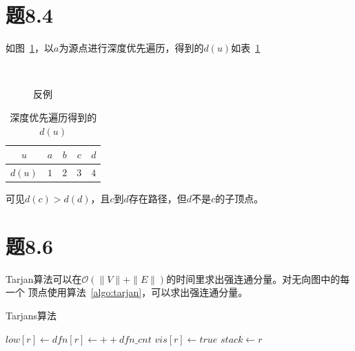 \documentclass[a4paper,twoside]{article}
\begin{document}
\begin{spacing}{1.2}
\section{题8.4}

如图~\ref{fig:t84_example}，以$a$为源点进行深度优先遍历，得到的$d(u)$如表~\ref{tbl:du}

\begin{figure}[htbp]
	\centering
	\label{fig:t84_example}
	~
	\caption{反例}
\end{figure}

\begin{table}[H]
	\centering
	\label{tbl:du}
	\begin{tabular}{ccccc}
		\toprule
		$u$ & $a$ & $b$ & $c$ & $d$ \\
		\midrule
		$d(u)$ & $1$ & $2$ & $3$ & $4$ \\
		\bottomrule
	\end{tabular}
	\caption{深度优先遍历得到的$d(u)$}
\end{table}

可见$d(c)>d(d)$，且$c$到$d$存在路径，但$d$不是$c$的子顶点。

\section{题8.6}

Tarjan算法可以在$\mathcal{O}(\|V\|+\|E\|)$的时间里求出强连通分量。对无向图中的每一个
顶点使用算法~\ref{algo:tarjan}，可以求出强连通分量。

\begin{algorithm}
	\caption{Tarjans算法}
	\label{algo:tarjan}
	\begin{algorithmic}[1]		
		\State $low[r]\gets dfn[r] \gets ++dfn\_cnt$
		\State $vis[r]\gets true$
		\State $stack\gets r$


\end{algorithmic}
\end{algorithm}
\end{spacing}
\end{document}
